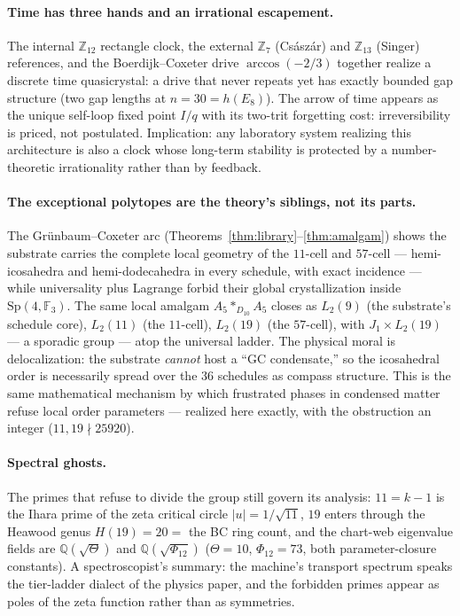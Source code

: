 \documentclass[11pt]{article}
\newcommand{\GF}[1]{\mathbb{F}_{#1}}
\newcommand{\Sp}{\mathrm{Sp}}
\begin{document}
\paragraph{Time has three hands and an irrational escapement.}
The internal $\mathbb{Z}_{12}$ rectangle clock, the external
$\mathbb{Z}_7$ (Cs\'asz\'ar) and $\mathbb{Z}_{13}$ (Singer)
references, and the Boerdijk--Coxeter drive $\arccos(-2/3)$ together
realize a discrete time quasicrystal: a drive that never repeats yet
has exactly bounded gap structure (two gap lengths at $n=30=h(E_8)$).
The arrow of time appears as the unique self-loop fixed point $I/q$
with its two-trit forgetting cost: irreversibility is priced, not
postulated.  Implication: any laboratory system realizing this
architecture is also a clock whose long-term stability is protected
by a number-theoretic irrationality rather than by feedback.

\paragraph{The exceptional polytopes are the theory's siblings, not
its parts.}  The Gr\"unbaum--Coxeter arc
(Theorems~\ref{thm:library}--\ref{thm:amalgam}) shows the substrate
carries the complete local geometry of the $11$-cell and $57$-cell
--- hemi-icosahedra and hemi-dodecahedra in every schedule, with
exact incidence --- while universality plus Lagrange forbid their
global crystallization inside $\Sp(4,\GF3)$.  The same local amalgam
$A_5\ast_{D_{10}}A_5$ closes as $L_2(9)$ (the substrate's schedule
core), $L_2(11)$ (the $11$-cell), $L_2(19)$ (the $57$-cell), with
$J_1\times L_2(19)$ --- a sporadic group --- atop the universal
ladder.  The physical moral is delocalization: the substrate
\emph{cannot} host a ``GC condensate,'' so the icosahedral order is
necessarily spread over the $36$ schedules as compass structure.
This is the same mathematical mechanism by which frustrated phases in
condensed matter refuse local order parameters --- realized here
exactly, with the obstruction an integer ($11,19\nmid 25920$).

\paragraph{Spectral ghosts.}  The primes that refuse to divide the
group still govern its analysis: $11=k-1$ is the Ihara prime of the
zeta critical circle $|u|=1/\sqrt{11}$, $19$ enters through the
Heawood genus $H(19)=20=$ the BC ring count, and the chart-web
eigenvalue fields are $\mathbb{Q}(\sqrt{\Theta})$ and
$\mathbb{Q}(\sqrt{\Phi_{12}})$ ($\Theta=10$, $\Phi_{12}=73$, both
parameter-closure constants).  A spectroscopist's summary: the
machine's transport spectrum speaks the tier-ladder dialect of the
physics paper, and the forbidden primes appear as poles of the zeta
function rather than as symmetries.
\end{document}

